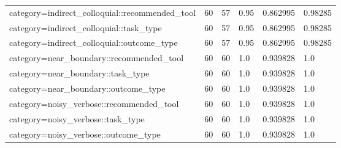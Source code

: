 \begin{table}[ht]
\begin{tabular}{llllll}
category=indirect\_colloquial::recommended\_tool & 60 & 57 & 0.95 & 0.862995 & 0.98285 \\
category=indirect\_colloquial::task\_type & 60 & 57 & 0.95 & 0.862995 & 0.98285 \\
category=indirect\_colloquial::outcome\_type & 60 & 57 & 0.95 & 0.862995 & 0.98285 \\
category=near\_boundary::recommended\_tool & 60 & 60 & 1.0 & 0.939828 & 1.0 \\
category=near\_boundary::task\_type & 60 & 60 & 1.0 & 0.939828 & 1.0 \\
category=near\_boundary::outcome\_type & 60 & 60 & 1.0 & 0.939828 & 1.0 \\
category=noisy\_verbose::recommended\_tool & 60 & 60 & 1.0 & 0.939828 & 1.0 \\
category=noisy\_verbose::task\_type & 60 & 60 & 1.0 & 0.939828 & 1.0 \\
category=noisy\_verbose::outcome\_type & 60 & 60 & 1.0 & 0.939828 & 1.0 \\
\bottomrule
\end{tabular}
\end{table}
